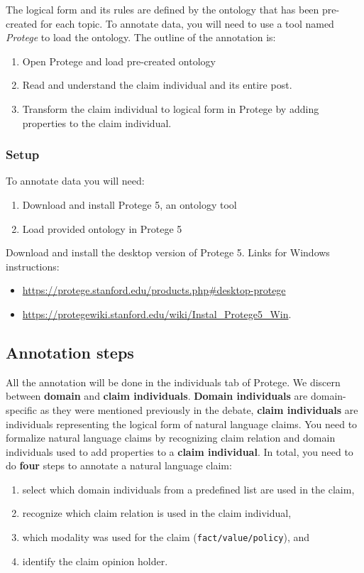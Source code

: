 \noindent The logical form and its rules are defined by the ontology that has been
pre-created for each topic. To annotate data, you will need to use a tool named
\textit{Protege} to load the ontology. 
The outline of the annotation is: 
\begin{enumerate}
\item Open Protege and load pre-created ontology
\item Read and understand the claim individual and its entire post.  
\item Transform the claim individual to logical form in Protege by adding properties to the claim
individual. 
\end{enumerate}

\subsubsection*{Setup}

To annotate data you will need:
\begin{enumerate}
\item Download and install Protege 5, an ontology tool
\item Load provided ontology in Protege 5
\end{enumerate}
Download and install the desktop version of Protege 5. Links for Windows instructions:
\begin{itemize}
\item \url{https://protege.stanford.edu/products.php#desktop-protege}
\item \url{https://protegewiki.stanford.edu/wiki/Instal_Protege5_Win}.
\end{itemize}

\subsection*{Annotation steps}

All the annotation will be done in the individuals tab of Protege. 
We discern between \textbf{domain} and \textbf{claim individuals}. 
\textbf{Domain individuals} are domain-specific as they
were mentioned previously in the debate, \textbf{claim individuals} are individuals
representing the logical form of natural language claims. 
You need to formalize natural language claims 
by recognizing claim relation and domain individuals
used to add properties to a \textbf{claim individual}. In total, you need to do \textbf{four}
steps to annotate a natural language claim:
\begin{enumerate}[label=\textbf{Step \arabic*.}, leftmargin=2cm]
\item select which domain individuals from a predefined list are used in the claim,
\item recognize which claim relation is used in the claim individual, 
\item which modality was used for the claim (\texttt{fact/value/policy}), and 
\item identify the claim opinion holder. 
\end{enumerate}


